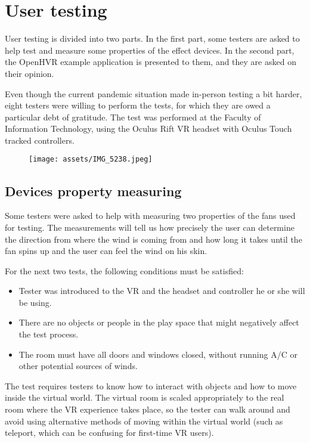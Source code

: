 \chapter{User testing}

User testing is divided into two parts. In the first part,
some testers are asked to help test and measure some properties
of the effect devices. In the second part, the OpenHVR example application is
presented to them, and they are asked on their opinion.


Even though the current pandemic situation made in-person testing a bit harder,
eight testers were willing to perform the tests, for which they are owed
a particular debt of gratitude.
The test was performed at the Faculty of Information Technology, using
the Oculus Rift VR headset with Oculus Touch tracked controllers.


\begin{figure}[h]{}
\centering\texttt{[image: assets/IMG\_5238.jpeg]}
\caption{}

\end{figure}

\hypertarget{x-devices-property-measuring}{\section{Devices property measuring}}
Some testers were asked to help with measuring two properties of the fans used
for testing. The measurements will tell us how precisely the user can determine the
direction from where the wind is coming from and how long it takes until the
fan spins up and the user can feel the wind on his skin.


For the next two tests, the following conditions must be satisfied:


\begin{itemize}

\item Tester was introduced to the VR and the headset and controller
he or she will be using.

\item There are no objects or people in the play space that might negatively affect
the test process.

\item The room must have all doors and windows closed, without running A/C
or other potential sources of winds.

\end{itemize}


The test requires testers to know how to interact with objects and how to move
inside the virtual world. The virtual room is scaled appropriately to the
real room where the VR experience takes place, so the tester can walk around
and avoid using alternative methods of moving within the virtual world
(such as teleport, which can be confusing for first-time VR users).


